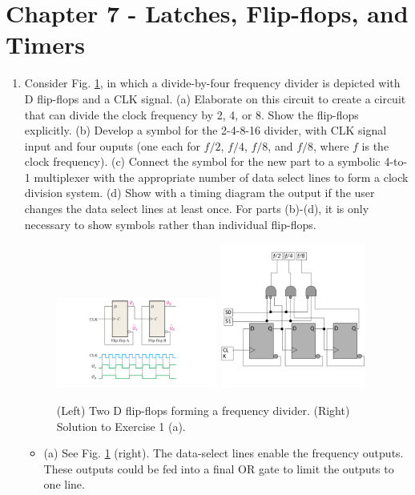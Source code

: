 \documentclass[10pt]{article}
\begin{document}
\section{Chapter 7 - Latches, Flip-flops, and Timers}
\label{sec:latch}
\begin{enumerate}
\item Consider Fig. \ref{fig:twoDFF}, in which a divide-by-four frequency divider is depicted with D flip-flops and a CLK signal. (a) Elaborate on this circuit to create a circuit that can divide the clock frequency by 2, 4, or 8. Show the flip-flops explicitly.  (b) Develop a symbol for the 2-4-8-16 divider, with CLK signal input and four ouputs (one each for $f/2$, $f/4$, $f/8$, and $f/8$, where $f$ is the clock frequency). (c) Connect the symbol for the new part to a symbolic 4-to-1 multiplexer with the appropriate number of data select lines to form a clock division system.  (d) Show with a timing diagram the output if the user changes the data select lines at least once.  For parts (b)-(d), it is only necessary to show symbols rather than individual flip-flops.
\begin{figure}[ht]
\centering
\includegraphics[width=0.5\textwidth]{figures/twoDFF.pdf}
\includegraphics[width=0.45\textwidth,trim=0cm 4cm 0cm 1cm,clip=true]{figures/design7.pdf}
\caption{\label{fig:twoDFF} (Left) Two D flip-flops forming a frequency divider. (Right) Solution to Exercise 1 (a).}
\end{figure}
\begin{itemize}
\item (a) See Fig. \ref{fig:twoDFF} (right).  The data-select lines enable the frequency outputs.  These outputs could be fed into a final OR gate to limit the outputs to one line.

\end{itemize}
\end{enumerate}
\end{document}
